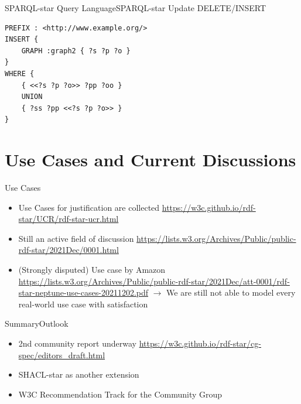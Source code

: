 \documentclass[aspectratio=169]{beamer}
\begin{document}
\begin{frame}[fragile]{SPARQL-star Query Language}{SPARQL-star Update}
 DELETE/INSERT
\begin{lstlisting}[language=SPARQL]
PREFIX : <http://www.example.org/>
INSERT {
    GRAPH :graph2 { ?s ?p ?o }
}
WHERE {
    { <<?s ?p ?o>> ?pp ?oo }
    UNION
    { ?ss ?pp <<?s ?p ?o>> }    
}
\end{lstlisting}
\end{frame}

\section{Use Cases and Current Discussions}
\begin{frame}{Use Cases}
 \begin{itemize}
     \item Use Cases for justification are collected \url{https://w3c.github.io/rdf-star/UCR/rdf-star-ucr.html}
     \item Still an active field of discussion \url{https://lists.w3.org/Archives/Public/public-rdf-star/2021Dec/0001.html}
     \item (Strongly disputed) Use case by Amazon \url{https://lists.w3.org/Archives/Public/public-rdf-star/2021Dec/att-0001/rdf-star-neptune-use-cases-20211202.pdf} $\rightarrow$ We are still not able to model every real-world use case with satisfaction
 \end{itemize}

\end{frame}

\begin{frame}{Summary}{Outlook}
	\begin{itemize}
	    \item 2nd community report underway \url{https://w3c.github.io/rdf-star/cg-spec/editors_draft.html}
		\item SHACL-star as another extension
		\item W3C Recommendation Track for the Community Group
\end{itemize}
\end{frame}
\end{document}
